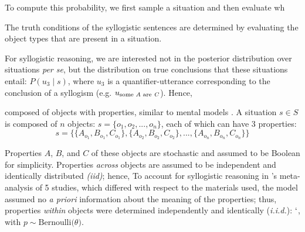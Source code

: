 \documentclass[floatsintext, man]{apa6}
\begin{document}
To compute this probability, we first sample a situation and then evaluate wh




The truth conditions of the syllogistic sentences are determined by evaluating the object types that are present in a situation.


For syllogistic reasoning, we are interested not in the posterior distribution over situations \emph{per se}, but the distribution on true conclusions that these situations entail: $P(u_3 \mid s)$, where $u_3$ is a quantifier-utterance corresponding to the conclusion of a syllogism (e.g. $u_{\textrm{some  \emph{A} are \emph{C}}}$). Hence,







composed of objects with properties, similar to mental models \cite{JL1983}. 
%
A situation $s \in S$ is composed of $n$ objects: $s = \{o_1, o_2, ..., o_n\}$, each of which can have 3 properties:
$$
s = \{ \{A_{o_{1}}, B_{o_{1}} , C_{o_{1}}\},  \{A_{o_{2}}, B_{o_{2}} , C_{o_{2}}\}, ... , \{A_{o_{n}}, B_{o_{n}} , C_{o_{n}}\} \}
$$

Properties $A$, $B$, and $C$ of these objects are stochastic
and assumed to be Boolean for simplicity. 
%
Properties \emph{across} objects are assumed to be independent and identically distributed \emph{(iid)}; hence, 
%
To account for syllogistic reasoning in 's meta-analysis of 5 studies, which differed with respect to the materials used, the model assumed no \emph{a priori} information about the meaning of the properties; thus, properties  \emph{within} objects were determined independently and identically (\emph{i.i.d.}): $`$, with $p \sim \text{Bernoulli(}\theta\text{)}$.
\end{document}

